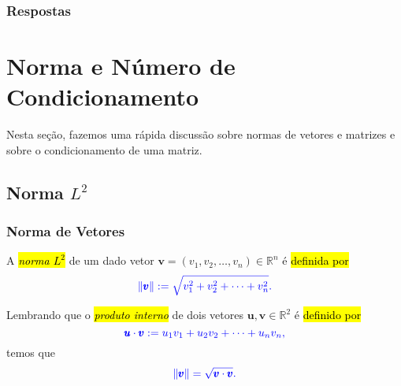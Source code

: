 \ifisbook
\subsubsection{Respostas}
\shipoutAnswer
\fi


\section{Norma e Número de Condicionamento}\label{cap_sislin_sec_ncond}

Nesta seção, fazemos uma rápida discussão sobre normas de vetores e matrizes e sobre o condicionamento de uma matriz.

\subsection{Norma $L^2$}

\subsubsection{Norma de Vetores}

A \hl{\emph{norma $L^2$}} de um dado vetor $\pmb{v} = (v_1, v_2, \dotsc, v_n) \in \mathbb{R}^n$ é \hl{definida por}
\begin{equation}\color{blue}\|\pmb{v}\| := \sqrt{v_1^2 + v_2^2 + \cdots + v_n^2}.
\end{equation}

Lembrando que o \hl{\emph{produto interno}} de dois vetores $\pmb{u},\pmb{v}\in\mathbb{R}^2$ é \hl{definido por}
\begin{equation}\color{blue}\pmb{u}\cdot\pmb{v} := u_1v_1 + u_2v_2 + \cdots + u_nv_n,
\end{equation}
temos que
\begin{equation}\color{blue}\|\pmb{v}\| = \sqrt{\pmb{v}\cdot\pmb{v}}.
\end{equation}

